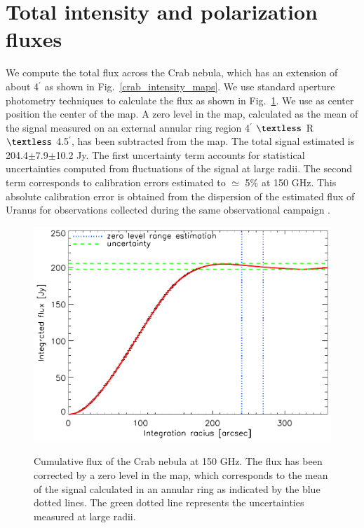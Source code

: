\documentclass[twocolumn,traditabstract]{aa}
\begin{document}
\section{Total intensity and polarization fluxes}\label{sec:Polarization estimates in CMB experiments like beams}
We compute the total flux across the Crab nebula, which has an extension of about  4$^{\prime}$ as shown in Fig.~\ref{crab_intensity_maps}.
We use standard aperture photometry techniques to calculate the flux as shown in Fig.~\ref{crab_integrated_flux}. We use as center position the center of the map. A zero level in the map, calculated as the mean of the signal measured on an external annular ring region 4$^\prime$ $\textless$  R $\textless$ 4.5$^\prime$, has been subtracted from the map. The total signal estimated is 204.4$\pm$7.9$\pm$10.2 Jy. The first uncertainty term accounts for statistical uncertainties computed from fluctuations of the signal at large radii. The second term corresponds to calibration errors estimated to $\simeq$ 5\% at 150 GHz. This absolute calibration error is obtained from the dispersion of the estimated flux of Uranus for observations collected during the same observational campaign \citep{ritacco2017}.

\begin{figure}[h!]
  \centering
     { \includegraphics[width=0.85\linewidth,keepaspectratio]{figures/Crab_integrated_flux_2mm.pdf}}
     \caption{Cumulative flux of the Crab nebula at 150 GHz. The flux has been corrected by a zero level in the map, which corresponds to the mean of the signal calculated in an annular ring as indicated by the blue dotted lines. The green dotted line represents the uncertainties measured at large radii.}
\label{crab_integrated_flux}
\end{figure}
\end{document}
